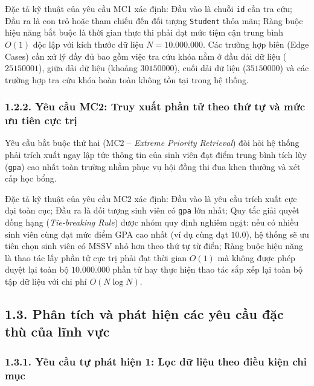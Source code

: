 \documentclass[14pt,a4paper]{extarticle}
\begin{document}
Đặc tả kỹ thuật của yêu cầu MC1 xác định: Đầu vào là chuỗi \texttt{id} cần tra cứu; Đầu ra là con trỏ hoặc tham chiếu đến đối tượng \texttt{Student} thỏa mãn; Ràng buộc hiệu năng bắt buộc là thời gian thực thi phải đạt mức tiệm cận trung bình $O(1)$ độc lập với kích thước dữ liệu $N = 10.000.000$. Các trường hợp biên (Edge Cases) cần xử lý đầy đủ bao gồm việc tra cứu khóa nằm ở đầu dải dữ liệu ($25150001$), giữa dải dữ liệu (khoảng $30150000$), cuối dải dữ liệu ($35150000$) và các trường hợp tra cứu khóa hoàn toàn không tồn tại trong hệ thống.

\subsubsection*{1.2.2. Yêu cầu MC2: Truy xuất phần tử theo thứ tự và mức ưu tiên cực trị}
{}

Yêu cầu bắt buộc thứ hai (MC2 -- \textit{Extreme Priority Retrieval}) đòi hỏi hệ thống phải trích xuất ngay lập tức thông tin của sinh viên đạt điểm trung bình tích lũy (\texttt{gpa}) cao nhất toàn trường nhằm phục vụ hội đồng thi đua khen thưởng và xét cấp học bổng.

Đặc tả kỹ thuật của yêu cầu MC2 xác định: Đầu vào là yêu cầu trích xuất cực đại toàn cục; Đầu ra là đối tượng sinh viên có \texttt{gpa} lớn nhất; Quy tắc giải quyết đồng hạng (\textit{Tie-breaking Rule}) được nhóm quy định nghiêm ngặt: nếu có nhiều sinh viên cùng đạt mức điểm GPA cao nhất (ví dụ cùng đạt $10.0$), hệ thống sẽ ưu tiên chọn sinh viên có MSSV nhỏ hơn theo thứ tự từ điển; Ràng buộc hiệu năng là thao tác lấy phần tử cực trị phải đạt thời gian $O(1)$ mà không được phép duyệt lại toàn bộ $10.000.000$ phần tử hay thực hiện thao tác sắp xếp lại toàn bộ tập dữ liệu với chi phí $O(N \log N)$.

\subsection*{1.3. Phân tích và phát hiện các yêu cầu đặc thù của lĩnh vực}
{}

\subsubsection*{1.3.1. Yêu cầu tự phát hiện 1: Lọc dữ liệu theo điều kiện chỉ mục}
{}
\end{document}
